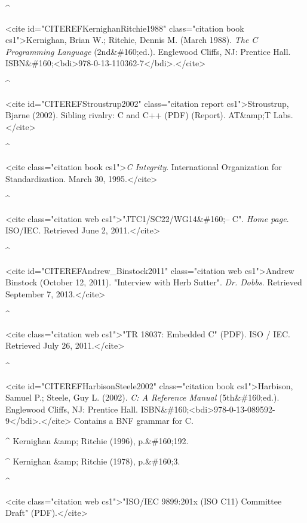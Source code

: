 \documentclass{article}\usepackage{titlesec}
\begin{document}
\item\textbf{\^} \item<cite id="CITEREFKernighanRitchie1988" class="citation book cs1">Kernighan, Brian W.; Ritchie, Dennis M. (March 1988). \emph{The C Programming Language} (2nd&\#160;ed.). Englewood Cliffs, NJ: Prentice Hall. ISBN&\#160;<bdi>978-0-13-110362-7</bdi>.</cite>

\item\textbf{\^} \item<cite id="CITEREFStroustrup2002" class="citation report cs1">Stroustrup, Bjarne (2002). Sibling rivalry: C and C++ (PDF) (Report). AT&amp;T Labs.</cite>

\item\textbf{\^} \item<cite class="citation book cs1">\emph{C Integrity}. International Organization for Standardization. March 30, 1995.</cite>

\item\textbf{\^} \item<cite class="citation web cs1">"JTC1/SC22/WG14&\#160;– C". \emph{Home page}. ISO/IEC. Retrieved June 2, 2011.</cite>

\item\textbf{\^} \item<cite id="CITEREFAndrew\_Binstock2011" class="citation web cs1">Andrew Binstock (October 12, 2011). "Interview with Herb Sutter". \emph{Dr. Dobbs}. Retrieved September 7, 2013.</cite>

\item\textbf{\^} \item<cite class="citation web cs1">"TR 18037: Embedded C" (PDF). ISO / IEC. Retrieved July 26, 2011.</cite>

\item\textbf{\^} \item<cite id="CITEREFHarbisonSteele2002" class="citation book cs1">Harbison, Samuel P.; Steele, Guy L. (2002). \emph{C: A Reference Manual} (5th&\#160;ed.). Englewood Cliffs, NJ: Prentice Hall. ISBN&\#160;<bdi>978-0-13-089592-9</bdi>.</cite> Contains a BNF grammar for C.

\item\textbf{\^} Kernighan &amp; Ritchie (1996), p.&\#160;192.

\item\textbf{\^} Kernighan &amp; Ritchie (1978), p.&\#160;3.

\item\textbf{\^} \item<cite class="citation web cs1">"ISO/IEC 9899:201x (ISO C11) Committee Draft" (PDF).</cite>
\end{document}
